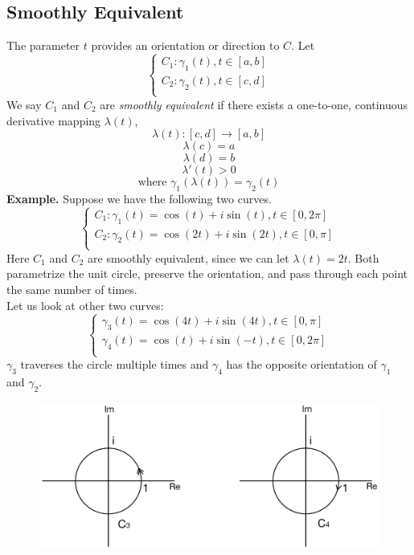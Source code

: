 \documentclass[11pt]{article}
\begin{document}
\subsection{Smoothly Equivalent}
The parameter $t$ provides an orientation or direction to $C$. Let 
\[ \begin{cases} 
	C_1: \gamma_1(t), t \in [a, b] \\
	C_2: \gamma_2(t), t \in [c, d]\\
   \end{cases}
\]
We say $C_1$ and $C_2$ are \textit{smoothly equivalent} if there exists a one-to-one, continuous derivative mapping $\lambda(t)$, 
$$\lambda(t): [c, d] \to [a, b]$$ 
$$\lambda(c) = a$$
$$\lambda(d) = b$$ 
$$\lambda'(t) > 0$$
\begin{equation*}
\mbox{where } \gamma_1(\lambda(t)) = \gamma_2(t)
\end{equation*}
\textbf{Example.} Suppose we have the following two curves. 
\[ \begin{cases} 
	C_1: \gamma_1(t) = \cos(t) + i\sin(t), t \in [0, 2\pi] \\
	C_2: \gamma_2(t) = \cos(2t) + i\sin(2t),  t \in [0, \pi]\\
   \end{cases}
\]
Here $C_1$ and $C_2$ are smoothly equivalent, since we can let $\lambda(t) = 2t$. Both parametrize the unit circle, preserve the orientation, and pass through each point the same number of times. \\
Let us look at other two curves: 
$$
\begin{cases} 
	\gamma_3(t) = \cos(4t) + i\sin(4t), t \in [0, \pi] \\
	\gamma_4(t) = \cos(t) + i\sin(-t),  t \in [0, 2\pi]\\
\end{cases}
$$
$\gamma_3$ traverses the circle multiple times and $\gamma_4$ has the opposite orientation of $\gamma_1$ and $\gamma_2$. 
\begin{figure}[H]
\includegraphics[scale = 0.18]{11_4}
\centering
\end{figure}
\end{document}
